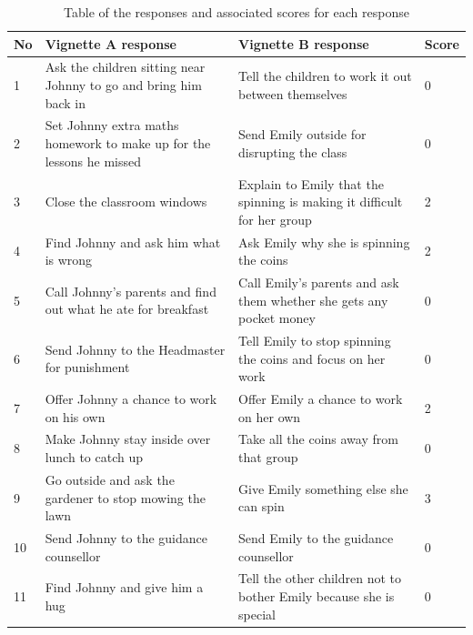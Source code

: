\documentclass[11pt]{report}
\begin{document}
\begin{table}[H]
    \begin{tabular}{ |p{1cm} | p{8cm} | p{8cm} | p{1cm} |}
    \hline
    No & \textbf{Vignette A response} & \textbf{Vignette B response} & \textbf{Score} \\                                                                                                                                                                                    
	\hline
	1 & Ask the children sitting near Johnny to go and bring him back in & Tell the children to work it out between themselves & 0 \\ \hline
 	2 & Set Johnny extra maths homework to make up for the lessons he missed & Send Emily outside for disrupting the class & 0 \\ \hline
 	3 & Close the classroom windows & Explain to Emily that the spinning is making it difficult for her group & 2 \\ \hline
	4 & Find Johnny and ask him what is wrong & Ask Emily why she is spinning the coins & 2 \\ \hline
	5 & Call Johnny’s parents and find out what he ate for breakfast & 	Call Emily’s parents and ask them whether she gets any pocket money & 0 \\ \hline
	6 & Send Johnny to the Headmaster for punishment & Tell Emily to stop spinning the coins and focus on her work & 0 \\ \hline
	7 & Offer Johnny a chance to work on his own & 	Offer Emily a chance to work on her own & 2 \\ \hline
	8 & Make Johnny stay inside over lunch to catch up & Take all the coins away from that group &  0 \\ \hline
	9 & Go outside and ask the gardener to stop mowing the lawn & Give Emily something else she can spin & 3 \\ \hline
	10 & Send Johnny to the guidance counsellor & Send Emily to the guidance counsellor &  0 \\ \hline
	11 & Find Johnny and give him a hug & Tell the other children not to bother Emily because she is special & 0 \\ 
    \hline
    \end{tabular}
    \caption{Table of the responses and associated scores for each response}
\end{table}
\end{document}
